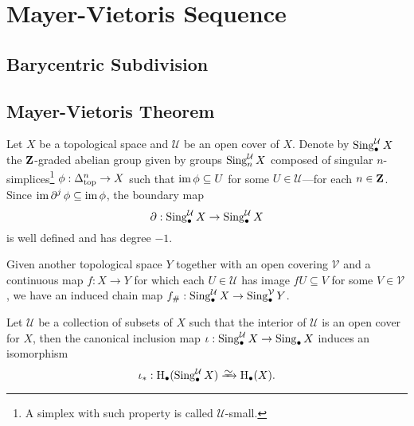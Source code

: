 \section{Mayer-Vietoris Sequence}

\subsection{Barycentric Subdivision}


\subsection{Mayer-Vietoris Theorem}

\begin{definition}
    \label{def:cover-singular-simplicial-complex}
    Let \(X\) be a topological space and \(\mathcal{U}\) be an open cover of \(X\). Denote by
    \(\operatorname{Sing}_{\bullet}^{\mathcal{U}} X\) the \(\mathbf{Z}\)-graded abelian group given by groups
    \(\operatorname{Sing}_n^{\mathcal{U}} X\) composed of singular \(n\)-simplices\footnote{A simplex with
        such property is called \(\mathcal{U}\)-small.} \(\phi: \Delta_{\text{top}}^n \to X\) such that
    \(\operatorname{im} \phi \subseteq U\) for some \(U \in \mathcal{U}\)---for each \(n \in \mathbf{Z}\). Since
    \(\operatorname{im} \operatorname{\partial}^j \phi \subseteq \operatorname{im} \phi\), the boundary map
    \[
        \operatorname{\partial}: \operatorname{Sing}_{\bullet}^{\mathcal{U}} X \to \operatorname{Sing}_{\bullet}^{\mathcal{U}} X
    \]
    is well defined and has degree \(-1\).

    Given another topological space \(Y\) together with an open covering
    \(\mathcal{V}\) and a continuous map \(f: X \to Y\) for which each
    \(U \in \mathcal{U}\) has image \(f U \subseteq V\) for some
    \(V \in \mathcal{V}\), we have an induced chain map
    \(f_{\#}: \operatorname{Sing}_{\bullet}^{\mathcal{U}} X \to \operatorname{Sing}_{\bullet}^{\mathcal{V}} Y\).
\end{definition}

\begin{theorem}
    \label{thm:iso-hmlg-groups-cover}
    Let \(\mathcal{U}\) be a collection of subsets of \(X\) such that the interior of
    \(\mathcal{U}\) is an open cover for \(X\), then the canonical inclusion map
    \(\iota: \operatorname{Sing}_{\bullet}^{\mathcal{U}} X \to \operatorname{Sing}_{\bullet} X\) induces an isomorphism
    \[
        \iota_{*}: \Hmlg_{\bullet}(\Sing_{\bullet}^{\mathcal{U}} X) \isoto \Hmlg_{\bullet}(X).
    \]
\end{theorem}

